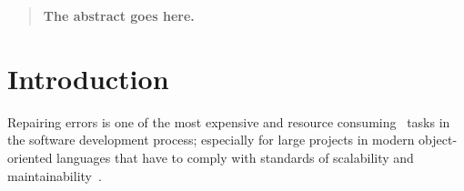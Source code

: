 \documentclass[conference]{IEEEtran}
\newcommand{\todo}[1]
  {{\scriptsize \textbf{\color{red} {#1}}}}
\begin{document}




\maketitle

\begin{abstract}
\todo{The abstract goes here.}
\end{abstract}





%
\IEEEpeerreviewmaketitle



\section{Introduction}



Repairing errors is one of the most expensive\cite{Tassey02,Britton13} and 
resource consuming~\cite{Weiss07} tasks in 
the software development process; especially for large projects in modern 
object-oriented languages that have to comply with standards of scalability and 
maintainability~\cite{Liblit03,Anvik05}. 
\end{document}
